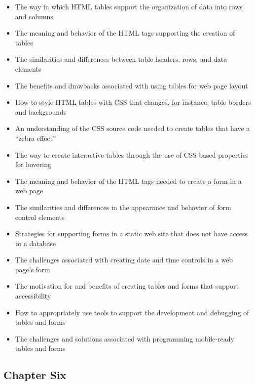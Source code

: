 \documentclass[11pt]{article}
\begin{document}
\begin{itemize}

  \itemsep 0.05in

  \item The way in which HTML tables support the organization of data into rows
    and columns
  \item The meaning and behavior of the HTML tags supporting the creation of
    tables
  \item The similarities and differences between table headers, rows, and data
    elements
  \item The benefits and drawbacks associated with using tables for web page
    layout
  \item How to style HTML tables with CSS that changes, for instance, table
    borders and backgrounds
  \item An understanding of the CSS source code needed to create tables that
    have a ``zebra effect''
  \item The way to create interactive tables through the use of CSS-based
    properties for hovering
  \item The meaning and behavior of the HTML tags needed to create a form in a
    web page
  \item The similarities and differences in the appearance and behavior of form
    control elements
  \item Strategies for supporting forms in a static web site that does not have
    access to a database
  \item The challenges associated with creating date and time controls in a web
    page's form
  \item The motivation for and benefits of creating tables and forms that
    support accessibility
  \item How to appropriately use tools to support the development and
    debugging of tables and forms

  \item The challenges and solutions associated with programming mobile-ready
    tables and forms

\end{itemize}

\vspace*{-.2in}
\subsection*{Chapter Six}
\end{document}
